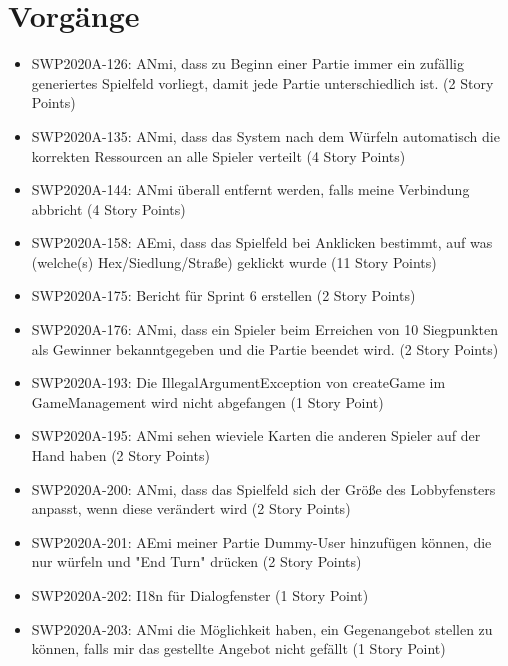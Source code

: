 \documentclass[12pt,a4paper, oneside]{article}
\begin{document}
\section{Vorgänge}

\begin{itemize}

\item SWP2020A-126: ANmi, dass zu Beginn einer Partie immer ein zufällig generiertes Spielfeld vorliegt, damit jede Partie unterschiedlich ist. (2 Story Points)

\item SWP2020A-135: ANmi, dass das System nach dem Würfeln automatisch die korrekten Ressourcen an alle Spieler verteilt (4 Story Points)

\item SWP2020A-144: ANmi überall entfernt werden, falls meine Verbindung abbricht (4 Story Points)

\item SWP2020A-158: AEmi, dass das Spielfeld bei Anklicken bestimmt, auf was (welche(s) Hex/Siedlung/Straße) geklickt wurde (11 Story Points)

\item SWP2020A-175: Bericht für Sprint 6 erstellen (2 Story Points)

\item SWP2020A-176: ANmi, dass ein Spieler beim Erreichen von 10 Siegpunkten als Gewinner bekanntgegeben und die Partie beendet wird. (2 Story Points)

\item SWP2020A-193: Die IllegalArgumentException von createGame im GameManagement wird nicht abgefangen (1 Story Point)

\item SWP2020A-195: ANmi sehen wieviele Karten die anderen Spieler auf der Hand haben (2 Story Points)

\item SWP2020A-200: ANmi, dass das Spielfeld sich der Größe des Lobbyfensters anpasst, wenn diese verändert wird (2 Story Points)

\item SWP2020A-201: AEmi meiner Partie Dummy-User hinzufügen können, die nur würfeln und "End Turn" drücken (2 Story Points)

\item SWP2020A-202: I18n für Dialogfenster (1 Story Point)

\item SWP2020A-203: ANmi die Möglichkeit haben, ein Gegenangebot stellen zu können, falls mir das gestellte Angebot nicht gefällt (1 Story Point)


\end{itemize}
\end{document}
